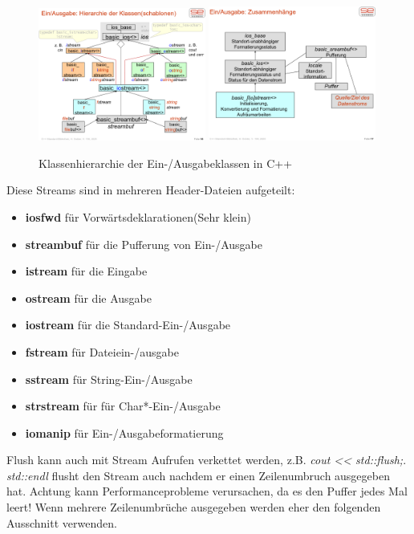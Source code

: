 \documentclass[12pt]{scrartcl}
\begin{document}
\begin{figure}[H]
	\centering
	\includegraphics[width=0.49\textwidth]{images/cpp_1.png}
	\includegraphics[width=0.49\textwidth]{images/cpp_2.png}
	\caption{Klassenhierarchie der Ein-/Ausgabeklassen in C++}
\end{figure}

Diese Streams sind in mehreren Header-Dateien aufgeteilt:
\begin{itemize}
	\item \textbf{iosfwd} für Vorwärtsdeklarationen(Sehr klein)
	\item \textbf{streambuf} für die Pufferung von Ein-/Ausgabe
	\item \textbf{istream} für die Eingabe
	\item \textbf{ostream} für die Ausgabe
	\item \textbf{iostream} für die Standard-Ein-/Ausgabe
	\item \textbf{fstream} für Dateiein-/ausgabe
	\item \textbf{sstream} für String-Ein-/Ausgabe
	\item \textbf{strstream} für für Char*-Ein-/Ausgabe
	\item \textbf{iomanip} für Ein-/Ausgabeformatierung
\end{itemize}

Flush kann auch mit Stream Aufrufen verkettet werden, z.B. \emph{cout << std::flush;}.
\emph{std::endl} flusht den Stream auch nachdem er einen Zeilenumbruch ausgegeben hat.
Achtung kann Performanceprobleme verursachen, da es den Puffer jedes Mal leert! Wenn mehrere
Zeilenumbrüche ausgegeben werden eher den folgenden Ausschnitt verwenden.
\end{document}
